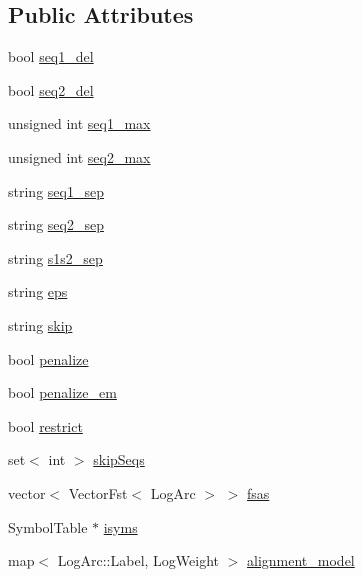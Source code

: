 \subsection*{Public Attributes}
\begin{DoxyCompactItemize}
\item 
bool \hyperlink{classfst_1_1_m2_m_fst_aligner_a1ea4cfa480a906720412d89e3cbdf78f}{seq1\+\_\+del}
\item 
bool \hyperlink{classfst_1_1_m2_m_fst_aligner_a5aaa4b5b87e92d8060aa23f28e9219e6}{seq2\+\_\+del}
\item 
unsigned int \hyperlink{classfst_1_1_m2_m_fst_aligner_ab83262d3fb217a148435777d28dcf3bd}{seq1\+\_\+max}
\item 
unsigned int \hyperlink{classfst_1_1_m2_m_fst_aligner_a5317b10db862b4f09b34e71b253b24c6}{seq2\+\_\+max}
\item 
string \hyperlink{classfst_1_1_m2_m_fst_aligner_a03ce5ddbcc042ece93dc2ac0dde9935d}{seq1\+\_\+sep}
\item 
string \hyperlink{classfst_1_1_m2_m_fst_aligner_a959c82581fc3a8a2a5999cc4daee123d}{seq2\+\_\+sep}
\item 
string \hyperlink{classfst_1_1_m2_m_fst_aligner_ae495dc0a0762485ad6b797bfe656cf53}{s1s2\+\_\+sep}
\item 
string \hyperlink{classfst_1_1_m2_m_fst_aligner_accef9f2dfd2f0c5a91ccf7c796d832cf}{eps}
\item 
string \hyperlink{classfst_1_1_m2_m_fst_aligner_a6632333cec0394fdb012ac60b91817ce}{skip}
\item 
bool \hyperlink{classfst_1_1_m2_m_fst_aligner_a6bf185403bdfc4bb5302235ba06f196b}{penalize}
\item 
bool \hyperlink{classfst_1_1_m2_m_fst_aligner_ae2218632c2af9b8b788d36bebb7db9b7}{penalize\+\_\+em}
\item 
bool \hyperlink{classfst_1_1_m2_m_fst_aligner_a11bb481204d03c4019f3fc0644da9320}{restrict}
\item 
set$<$ int $>$ \hyperlink{classfst_1_1_m2_m_fst_aligner_adf30d66ed3320bb5f0d5c18a08861a3b}{skip\+Seqs}
\item 
vector$<$ Vector\+Fst$<$ Log\+Arc $>$ $>$ \hyperlink{classfst_1_1_m2_m_fst_aligner_adfa1cb33010886b0f58955d4ad5572cd}{fsas}
\item 
Symbol\+Table $\ast$ \hyperlink{classfst_1_1_m2_m_fst_aligner_a9a259b679800a82cca3822f6abaa0e60}{isyms}
\item 
map$<$ Log\+Arc\+::\+Label, Log\+Weight $>$ \hyperlink{classfst_1_1_m2_m_fst_aligner_a28eef199b821dbf9a30c4e5e0c2f91f5}{alignment\+\_\+model}

\end{DoxyCompactItemize}
